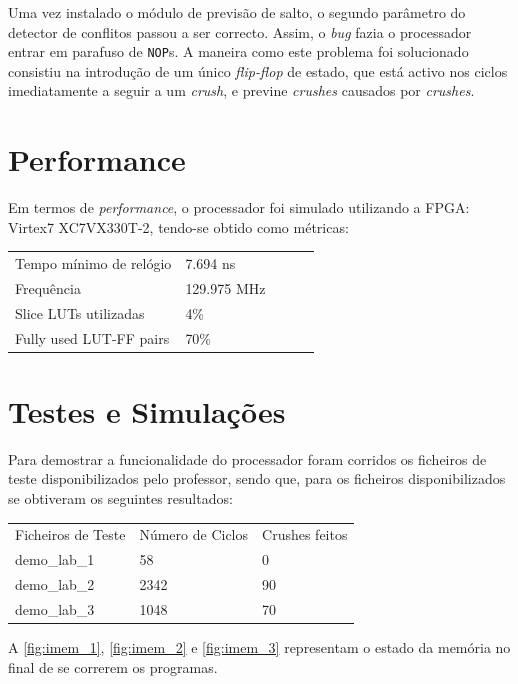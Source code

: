 \documentclass[a4paper]{article}
\begin{document}
	Uma vez instalado o módulo de previsão de salto, o segundo parâmetro do detector de conflitos passou a ser correcto. Assim, o \textit{bug} fazia o processador entrar em parafuso de \texttt{NOP}s. A maneira como este problema foi solucionado consistiu na introdução de um único \textit{flip-flop} de estado, que está activo nos ciclos imediatamente a seguir a um \textit{crush}, e previne \textit{crushes} causados por \textit{crushes}.
		
	\section{Performance}
	
	Em termos de \textit{performance}, o processador foi simulado utilizando a FPGA: Virtex7 XC7VX330T-2, tendo-se obtido como métricas:
	
	\begin{table}[h]
		\centering
		\begin{tabular}{lllll}
			Tempo mínimo de relógio & 7.694 ns  \\
			Frequência &  129.975 MHz\\
			Slice LUTs utilizadas &  4\%\\
			Fully used LUT-FF pairs & 70\%\\
			
		\end{tabular}
	\end{table}
	  
	
	
	\section{Testes e Simulações} 
		
	Para demostrar a funcionalidade do processador foram corridos os ficheiros de teste disponibilizados pelo professor, sendo que, para os ficheiros disponibilizados se obtiveram os seguintes resultados:
	\begin{table}[h]
		\centering
		\begin{tabular}{lllll}
			Ficheiros de Teste & Número de Ciclos & \multicolumn{3}{l}{Crushes feitos} \\
			demo\_lab\_1 & 58 & 0 \\
			demo\_lab\_2 & 2342 & 90 \\
			demo\_lab\_3 & 1048 & 70
		\end{tabular}
	\end{table}
		A \autoref{fig:imem_1}, \autoref{fig:imem_2} e \autoref{fig:imem_3} representam o estado da memória no final de se correrem os programas.
		
\end{document}
